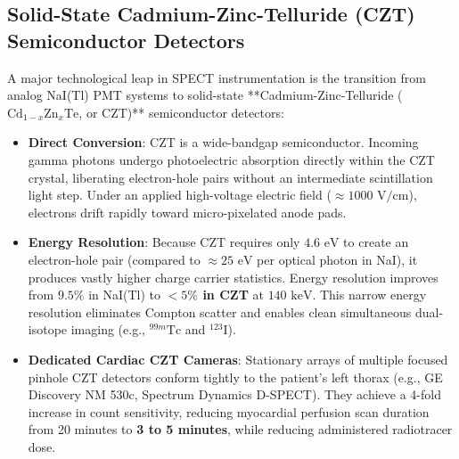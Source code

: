 \documentclass[11pt,a4paper]{article}
\begin{document}
\subsection{Solid-State Cadmium-Zinc-Telluride (CZT) Semiconductor Detectors}
A major technological leap in SPECT instrumentation is the transition from analog NaI(Tl) PMT systems to solid-state **Cadmium-Zinc-Telluride ($\text{Cd}_{1-x}\text{Zn}_x\text{Te}$, or CZT)** semiconductor detectors:
\begin{itemize}[leftmargin=*]
    \item \textbf{Direct Conversion}: CZT is a wide-bandgap semiconductor. Incoming gamma photons undergo photoelectric absorption directly within the CZT crystal, liberating electron-hole pairs without an intermediate scintillation light step. Under an applied high-voltage electric field ($\approx 1000\text{ V/cm}$), electrons drift rapidly toward micro-pixelated anode pads.
    \item \textbf{Energy Resolution}: Because CZT requires only $4.6\text{ eV}$ to create an electron-hole pair (compared to $\approx 25\text{ eV}$ per optical photon in NaI), it produces vastly higher charge carrier statistics. Energy resolution improves from $9.5\%$ in NaI(Tl) to \textbf{$<5\%$ in CZT} at $140\text{ keV}$. This narrow energy resolution eliminates Compton scatter and enables clean simultaneous dual-isotope imaging (e.g., $^{99m}\text{Tc}$ and $^{123}\text{I}$).
    \item \textbf{Dedicated Cardiac CZT Cameras}: Stationary arrays of multiple focused pinhole CZT detectors conform tightly to the patient's left thorax (e.g., GE Discovery NM 530c, Spectrum Dynamics D-SPECT). They achieve a 4-fold increase in count sensitivity, reducing myocardial perfusion scan duration from 20 minutes to \textbf{3 to 5 minutes}, while reducing administered radiotracer dose.
\end{itemize}
\end{document}
